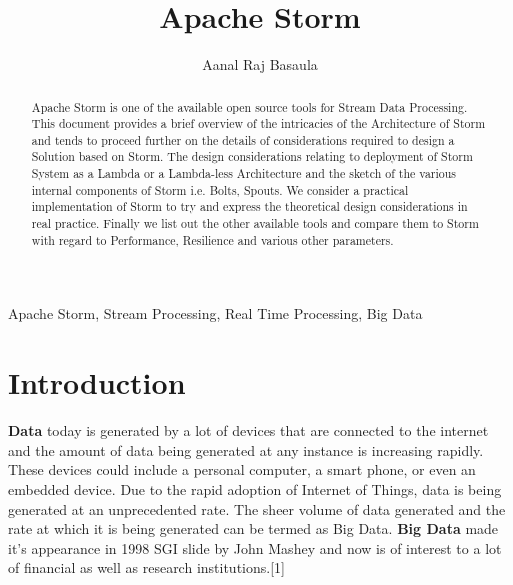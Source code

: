 \documentclass[runningheads,a4paper]{llncs}[2015/06/24]
\begin{document}
\title{Apache Storm}

\author{Aanal Raj Basaula}






\frontpageen %

\thispagestyle{empty}
\cleardoublepage

\maketitle

\begin{abstract}
Apache Storm is one of the available open source tools for Stream Data Processing. This document provides a brief overview of the intricacies of the Architecture of Storm and tends to proceed further on the details of considerations required to design a Solution based on Storm. The design considerations relating to deployment of Storm System as a Lambda or a Lambda-less Architecture and the sketch of the various internal components of Storm i.e. Bolts, Spouts. We consider a practical implementation of Storm to try and express the theoretical design considerations in real practice. Finally we list out the other available tools and compare them to Storm with regard to Performance, Resilience and various other parameters.
\end{abstract}

\begin{keywords}
Apache Storm, Stream Processing, Real Time Processing, Big Data
\end{keywords}

\section{Introduction}

\textbf{Data} today is generated by a lot of devices that are connected to the internet and the amount of data being generated at any instance is increasing rapidly. These devices could include a personal computer, a smart phone, or even an embedded device. Due to the rapid adoption of Internet of Things, data is being generated at an unprecedented rate. The sheer volume of data generated and the rate at which it is being generated can be termed as Big Data. \textbf{Big Data} made it's appearance in 1998 SGI slide by John Mashey and now is of interest to a lot of financial as well as research institutions.[1]
\end{document}
